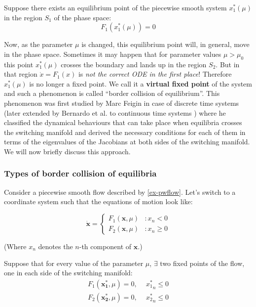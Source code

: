 \documentclass[oneside]{book}
\renewcommand{\(}{\begin{columns}}
\renewcommand{\)}{\end{columns}}
\newcommand{\<}[1]{\begin{column}{#1}}
\renewcommand{\>}{\end{column}}
\newcommand{\bb}[1]{\textbf{#1}}
\newcommand{\mb}[1]{\mathbf{#1}}
\begin{document}
Suppose there exists an equilibrium point of the 
piecewise smooth system $x_1^*(\mu)$ in the region $S_1$ of the phase space:
\[
F_1(x_1^*(\mu))=0
\]


Now, as the parameter $\mu$ is changed, this equilibrium point will, in general, move in the phase 
space.  Sometimes it may happen that for parameter values $\mu>\mu_0$ this point $x_1^*(\mu)$ crosses the 
boundary and lands up in the region $S_2$.  But in that region $\dot{x}=F_1(x)$ 
is \emph{not the correct ODE in the first place}! Therefore $x_1^*(\mu)$ is no longer 
a fixed point.  We call it a \bb{virtual fixed point}  of the system and such a phenomenon is called 
``border collision of equilibrium''. This phenomenon was first studied by Marc 
Feigin in case of discrete time systems \cite{feigin-1999}(later extended by 
Bernardo et al. to continuous time systems \cite{bernardo-c-cases}) where he classified the dynamical 
behaviours that can take place when equilibria crosses the switching manifold and 
 derived the necessary conditions for each of them in
terms of the eigenvalues of the Jacobians at both sides of the switching 
manifold. We will now briefly discuss this approach.  

\subsubsection{Types of border collision of equilibria}
Consider a piecewise smooth flow described by \eqref{ex-pwflow}. Let's switch 
to a coordinate system such that the equations of motion look like:

\begin{equation}
\label{ex-pwflow_normal}
   \dot{\mathbf{x}} = \left\{
     \begin{array}{lr}
       F_1(\mathbf{x},\mu) & : x_n<0\\
       F_2(\mathbf{x},\mu) & : x_n\geq0
     \end{array}
   \right.
\end{equation}

(Where $x_n$ denotes the $n$-th component of $\mathbf{x}$.)

Suppose that for every value of the parameter $\mu$, $\exists$ two fixed 
points of the flow, one in each side of the switching manifold:
\begin{align}
\label{def-2fps}
F_1(\mb{x_1^*},\mu)=0,&~~{x_1^*}_n\leq 0\\
F_2(\mb{x_2^*},\mu)=0,&~~{x_2^*}_n\leq 0
\end{align}
\end{document}
